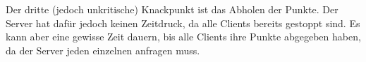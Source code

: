 Der dritte (jedoch unkritische) Knackpunkt ist das Abholen der Punkte. Der Server hat dafür jedoch keinen Zeitdruck, da alle Clients bereits gestoppt sind. Es kann aber eine gewisse Zeit dauern, bis alle Clients ihre Punkte abgegeben haben, da der Server jeden einzelnen anfragen muss.



